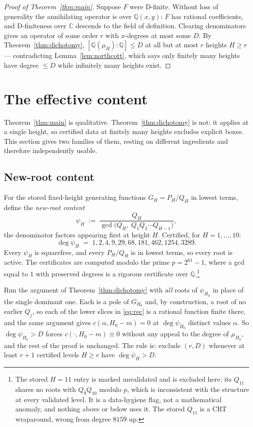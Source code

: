 \documentclass[11pt]{article}
\newcommand{\Q}{\mathbb{Q}}
\newcommand{\C}{\mathbb{C}}
\begin{document}
\begin{proof}[Proof of Theorem~\ref{thm:main}]
Suppose $F$ were D-finite. Without loss of generality the annihilating operator
is over $\Q(x,y)$: $F$ has rational coefficients, and D-finiteness over $\C$
descends to the field of definition. Clearing denominators gives an operator of
some order $r$ with $x$-degrees at most some $D$. By
Theorem~\ref{thm:dichotomy}, $[\Q(\mu_H):\Q] \le D$ at all but at most $r$
heights $H \ge r$ --- contradicting Lemma~\ref{lem:northcott}, which says only
finitely many heights have degree $\le D$ while infinitely many heights exist.
\end{proof}

\section{The effective content}
\label{sec:effective}

Theorem~\ref{thm:main} is qualitative. Theorem~\ref{thm:dichotomy} is not: it
applies at a single height, so certified data at finitely many heights excludes
explicit boxes. This section gives two families of them, resting on different ingredients and
therefore independently usable.

\subsection{New-root content}

For the stored fixed-height generating functions $G_H = P_H/Q_H$ in lowest terms,
define the \emph{new-root content}
\[
  \psi_H \;:=\; \frac{Q_H}{\gcd\bigl(Q_H,\; Q_1Q_2\cdots Q_{H-1}\bigr)} ,
\]
the denominator factors appearing first at height $H$. Certified, for
$H = 1,\dots,10$:
\[
  \deg\psi_H \;=\; 1, 2, 4, 9, 29, 68, 181, 462, 1254, 3289 .
\]
Every $\psi_H$ is squarefree, and every $P_H/Q_H$ is in lowest terms, so every
root is active. The certificates are computed modulo the prime $p = 2^{61}-1$, where a
gcd equal to $1$ with preserved degrees is a rigorous certificate over
$\Q$.\footnote{The stored $H = 11$ entry is marked unvalidated and is excluded
here: its $Q_{11}$ shares no roots with $Q_9Q_{10}$ modulo $p$, which is
inconsistent with the structure at every validated level. It is a data-hygiene
flag, not a mathematical anomaly, and nothing above or below uses it. The stored
$Q_{11}$ is a CRT wraparound, wrong from degree $8159$ up.}

Run the argument of Theorem~\ref{thm:dichotomy} with \emph{all} roots of
$\psi_{H_0}$ in place of the single dominant one. Each is a pole of $G_{H_0}$ and,
by construction, a root of no earlier $Q_j$, so each of the lower slices in
\eqref{eq:rec} is a rational function finite there, and the
same argument gives $c(\alpha,H_0-m) = 0$ at $\deg\psi_{H_0}$ distinct values
$\alpha$. So $\deg\psi_{H_0} > D$ forces $c(\cdot,H_0-m) \equiv 0$ without any
appeal to the degree of $\mu_{H_0}$, and the rest of the proof is unchanged. The
rule is: exclude $(r,D)$ whenever at least $r+1$ certified levels $H \ge r$ have
$\deg\psi_H > D$.
\end{document}
